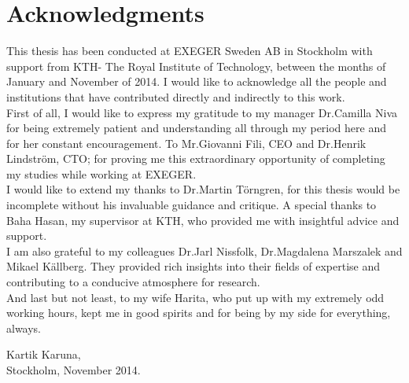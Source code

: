 \chapter*{Acknowledgments}
\thispagestyle{begin}


This thesis has been conducted at EXEGER Sweden AB in Stockholm with support from KTH- The Royal Institute of Technology, between the months of January and November of 2014. I would like to acknowledge all the people and institutions that have contributed directly and indirectly to this work.\\

First of all, I would like to express my gratitude to my manager Dr.Camilla Niva for being extremely patient and understanding all through my period here and for her constant encouragement. To Mr.Giovanni Fili, CEO and Dr.Henrik Lindström, CTO; for proving me this extraordinary opportunity of completing my studies while working at EXEGER.\\

I would like to extend my thanks to Dr.Martin Törngren, for this thesis would be incomplete without his invaluable guidance and critique. A special thanks to Baha Hasan, my supervisor at KTH, who provided me with insightful advice and support.\\ 

I am also grateful to my colleagues Dr.Jarl Nissfolk, Dr.Magdalena Marszalek and Mikael Källberg. They provided rich insights into their fields of expertise and contributing to a conducive atmosphere for research.\\ 

And last but not least, to my wife Harita, who put up with my extremely odd working hours, kept me in good spirits and for being by my side for everything, always.  

\begin{flushright}
Kartik Karuna,\\
Stockholm, November 2014.
\end{flushright}